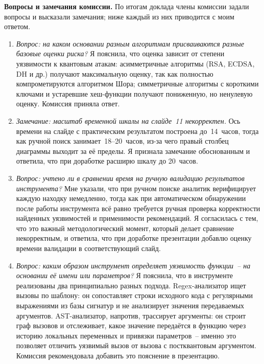 \documentclass{itmo-vkr}
\begin{document}
\textbf{Вопросы и замечания комиссии.} По итогам доклада члены комиссии задали вопросы и высказали замечания; ниже каждый из них приводится с моим ответом.

\begin{enumerate}
    \item \textit{Вопрос: на каком основании разным алгоритмам присваиваются разные базовые оценки риска?} Я пояснила, что оценка зависит от степени уязвимости к квантовым атакам: асимметричные алгоритмы (RSA, ECDSA, DH и др.) получают максимальную оценку, так как полностью компрометируются алгоритмом Шора; симметричные алгоритмы с короткими ключами и устаревшие хеш-функции получают пониженную, но ненулевую оценку. Комиссия приняла ответ.

    \item \textit{Замечание: масштаб временной шкалы на слайде~11 некорректен.} Ось времени на слайде с практическим результатом построена до~14~часов, тогда как ручной поиск занимает~18--20~часов, из-за чего правый столбец диаграммы выходит за её пределы. Я признала замечание обоснованным и ответила, что при доработке расширю шкалу до 20~часов.

    \item \textit{Вопрос: учтено ли в сравнении время на ручную валидацию результатов инструмента?} Мне указали, что при ручном поиске аналитик верифицирует каждую находку немедленно, тогда как при автоматическом обнаружении после работы инструмента всё равно требуется ручная проверка корректности найденных уязвимостей и применимости рекомендаций. Я согласилась с тем, что это важный методологический момент, который делает сравнение некорректным, и ответила, что при доработке презентации добавлю оценку времени валидации в соответствующий слайд.

    \item \textit{Вопрос: каким образом инструмент определяет уязвимость функции~-- на основании её имени или параметров?} Я пояснила, что в инструменте реализованы два принципиально разных подхода. Regex-анализатор ищет вызовы по шаблону: он сопоставляет строки исходного кода с регулярными выражениями из базы сигнатур и не анализирует значения передаваемых аргументов. AST-анализатор, напротив, трассирует аргументы: он строит граф вызовов и отслеживает, какое значение передаётся в функцию через историю локальных переменных и привязки параметров~-- именно это позволяет отличить уязвимый вызов от вызова с постквантовым аргументом. Комиссия рекомендовала добавить это пояснение в презентацию.

\end{enumerate}
\end{document}
